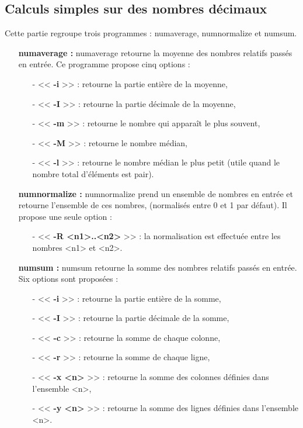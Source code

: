 \subsection{Calculs simples sur des nombres d\'ecimaux}

Cette partie regroupe trois programmes : numaverage, numnormalize et numsum.
\newline
\begin{itemize}
 \item[\textbullet] \textbf{numaverage :} numaverage retourne la moyenne des nombres relatifs pass\'es en entr\'ee.
Ce programme propose cinq options :
\begin{itemize}
  \item[-] << \textbf{-i} >> : retourne la partie enti\`ere de la moyenne,
  \item[-] << \textbf{-I} >> : retourne la partie d\'ecimale de la moyenne,
  \item[-] << \textbf{-m} >> : retourne le nombre qui appara\^it le plus souvent,
  \item[-] << \textbf{-M} >> : retourne le nombre m\'edian,
  \item[-] << \textbf{-l} >> : retourne le nombre m\'edian le plus petit (utile quand le nombre total d'\'el\'ements est pair).
\newline
\end{itemize}
\item[\textbullet] \textbf{numnormalize :} numnormalize prend un ensemble de nombres en entr\'ee et retourne l'ensemble de ces nombres, 
(normalis\'es entre 0 et 1 par d\'efaut). Il propose une seule option :
\begin{itemize}
 \item[-] << \textbf{-R <n1>..<n2>} >> : la normalisation est effectu\'ee entre les nombres <n1> et <n2>.
\newline
\end{itemize}
 \item[\textbullet] \textbf{numsum :} numsum retourne la somme des nombres relatifs pass\'es en entr\'ee.
Six options sont propos\'ees :
\begin{itemize}
 \item[-] << \textbf{-i} >> : retourne la partie enti\`ere de la somme,
 \item[-] << \textbf{-I} >> : retourne la partie d\'ecimale de la somme,
 \item[-] << \textbf{-c} >> : retourne la somme de chaque colonne,
 \item[-] << \textbf{-r} >> : retourne la somme de chaque ligne,
 \item[-] << \textbf{-x <n>} >> : retourne la somme des colonnes d\'efinies dans l'ensemble <n>,
 \item[-] << \textbf{-y <n>} >> : retourne la somme des lignes d\'efinies dans l'ensemble <n>.
\end{itemize}
\end{itemize}

